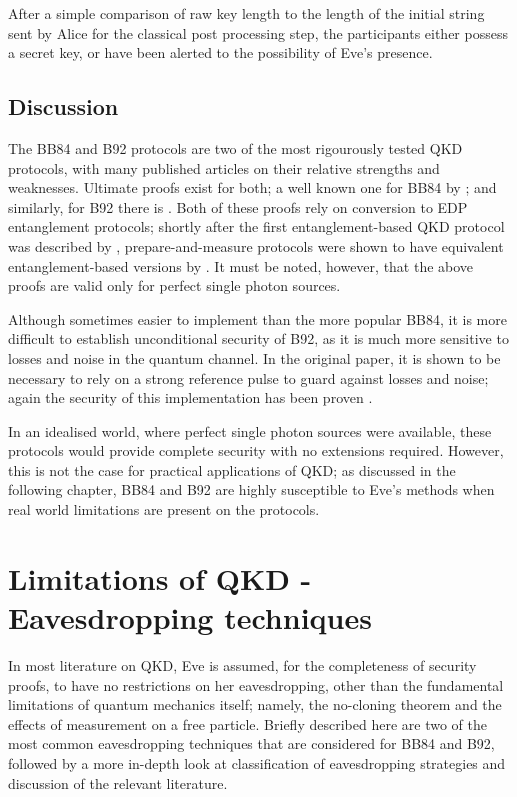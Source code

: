 \documentclass[paper=a4, fontsize=11pt]{scrartcl} %
\numberwithin{equation}{section} %
\numberwithin{figure}{section} %
\numberwithin{table}{section} %
\begin{document}
After a simple comparison of raw key length to the length of the initial string sent by Alice for the classical
post processing step, the participants either possess a secret key, or have been alerted to the possibility
of Eve's presence.

\subsection{Discussion}
The BB84 and B92 protocols are two of the most rigourously tested QKD protocols, with many published articles
on their relative strengths and weaknesses. Ultimate proofs exist for both; a well known one for BB84
by \citet{proofBB84}; and similarly, for B92 there is \citet{tamakiProofB92}. Both of these proofs rely on
conversion to EDP entanglement protocols; shortly after the first entanglement-based QKD protocol was
described by \citet{E91}, prepare-and-measure protocols were shown to have equivalent entanglement-based
versions by \citet{edpEquivProof}. It must be noted, however, that the above proofs are valid only
for perfect single photon sources.

Although sometimes easier to implement than the more popular BB84, it is more difficult to establish
unconditional security of B92, as it is much more sensitive to losses and noise in the
quantum channel. In the original paper, it is shown to be necessary
to rely on a strong reference pulse to guard against
losses and noise; again the security of this implementation has been proven
\citep{tamakiStrongRefProofB92}.

In an idealised world, where perfect single photon sources were available,
these protocols would provide complete security with no extensions required.
However, this is not the case for practical applications of QKD;
as discussed in the following chapter, BB84 and B92 are highly susceptible to
Eve's methods when real world limitations are present on the protocols.

\clearpage
\section{Limitations of QKD - Eavesdropping techniques}
In most literature on QKD, Eve is assumed, for the completeness of security proofs, to have no restrictions
on her eavesdropping, other than the fundamental limitations of quantum mechanics itself; namely, the
no-cloning theorem and the effects of measurement on a free particle. Briefly described here are two of the
most common eavesdropping techniques that are considered for BB84 and B92, followed by a more in-depth look
at classification of eavesdropping strategies and discussion of the relevant literature.
\end{document}
